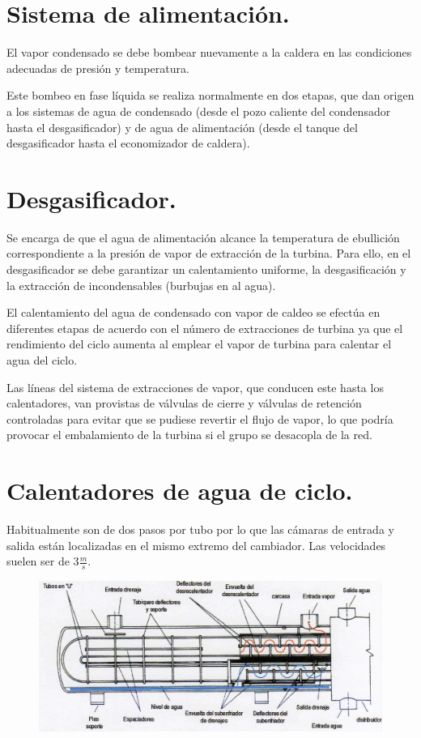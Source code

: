 \section{Sistema de alimentación.}
El vapor condensado se debe bombear nuevamente a la caldera en las condiciones adecuadas de presión y temperatura.



Este bombeo en fase líquida se realiza normalmente en dos etapas, que dan origen a los
sistemas de agua de condensado (desde el pozo caliente del condensador hasta el
desgasificador) y de agua de alimentación (desde el tanque del desgasificador hasta el
economizador de caldera).
\section{Desgasificador.}
Se encarga de que el agua de alimentación  alcance la temperatura de ebullición correspondiente a la presión de vapor de
extracción de la turbina. Para ello, en el desgasificador se debe garantizar un calentamiento uniforme, la desgasificación y la extracción de incondensables (burbujas en al agua).


El calentamiento del agua de condensado con vapor de caldeo se efectúa en diferentes
etapas de acuerdo con el número de extracciones de turbina ya que el rendimiento del ciclo aumenta al emplear el vapor de turbina para calentar el agua del
ciclo.



Las líneas del sistema de extracciones de vapor, que conducen este hasta los calentadores,
van provistas de válvulas de cierre y válvulas de retención controladas para evitar que se
pudiese revertir el flujo de vapor, lo que podría provocar el embalamiento de la turbina si el
grupo se desacopla de la red.


\section{Calentadores de agua de ciclo.}
Habitualmente son de dos pasos por tubo por lo que las cámaras de entrada y salida están
localizadas en el mismo extremo del cambiador. Las velocidades suelen ser de 3$\frac{m}{s}$.
\begin{figure}[H]
	\centering
	\includegraphics[width=1\linewidth]{res/tema10/calentador}
	\label{fig:calentador}
\end{figure}

